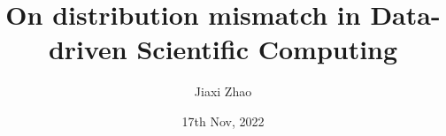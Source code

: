 \documentclass{beamer}
\title[Distribution Mismatch]{On distribution mismatch in Data-driven Scientific Computing}
\author[J. Zhao]{Jiaxi Zhao}
\date{17th Nov, 2022}
\begin{document}
\par \setlength{\parindent}{2em}

\begin{frame}
\titlepage

\end{frame}

\end{document}
